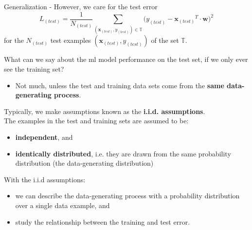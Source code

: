 \begin{frame}[t,allowframebreaks]{Generalization -}
    However, we care for the test error
    \begin{equation}
        L_{(test)} = \frac{1}{N_{(test)}} 
        \sum_{({\mathbf x_{(test)}},y_{(test)})  \in \mathbb{T}}
        \Big( y_{(test)} - {\mathbf x_{(test)}}^T \cdot {\mathbf w} \Big)^2
    \end{equation}        
    for the $N_{(test)}$ test examples $({\mathbf x_{(test)}},y_{(test)})$ 
    of the set $\mathbb{T}$.

    \framebreak


    What can we say about the \gls{ml} model performance on the test set,
    if we only ever see the training set?
    \begin{itemize}
        \item
        Not much, unless the test and training data sets come from the 
        {\bf same data-generating process}.    
    \end{itemize}
    \vspace{0.2cm}   
    Typically, we make assumptions known as the {\bf i.i.d. assumptions}.\\
    \vspace{0.2cm}
    The examples in the test and training sets are assumed to be:
    \begin{itemize}
        \item {\bf independent}, and
        \item {\bf identically distributed}, 
        i.e. they are drawn from the same probability distribution 
        (the data-generating distribution)
    \end{itemize}
    \vspace{0.2cm}
    With the i.i.d assumptions:
    \begin{itemize}
        \item
        we can describe the data-generating process
        with a probability distribution over a single data example, and
        \item
        study the relationship between the training and test error.
    \end{itemize}

\end{frame}

